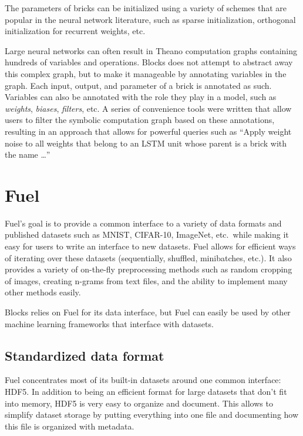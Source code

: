 \documentclass[twoside,11pt]{article}
\begin{document}
The parameters of bricks can be initialized using a variety of schemes that are
popular in the neural network literature, such as sparse initialization,
orthogonal initialization for recurrent weights, etc.

Large neural networks can often result in Theano computation graphs containing
hundreds of variables and operations. Blocks does not attempt to abstract away
this complex graph, but to make it manageable by annotating variables in the
graph. Each input, output, and parameter of a brick is annotated as such.
Variables can also be annotated with the role they play in a model, such as
\emph{weights}, \emph{biases}, \emph{filters}, etc. A series of convenience
tools were written that allow users to filter the symbolic computation graph
based on these annotations, resulting in an approach that allows for powerful
queries such as ``Apply weight noise to all weights that belong to an LSTM
unit whose parent is a brick with the name \ldots''

\section{Fuel}

Fuel's goal is to provide a common interface to a variety of data formats and
published datasets such as MNIST, CIFAR-10, ImageNet, etc.\ while making it easy
for users to write an interface to new datasets. Fuel allows for efficient ways
of iterating over these datasets (sequentially, shuffled, minibatches, etc.).
It also provides a variety of on-the-fly preprocessing methods such as random
cropping of images, creating n-grams from text files, and the ability to
implement many other methods easily.

Blocks relies on Fuel for its data interface, but Fuel can easily be used by
other machine learning frameworks that interface with datasets.

\subsection{Standardized data format}

Fuel concentrates most of its built-in datasets around one common interface:
HDF5. In addition to being an efficient format for large datasets that don't
fit into memory, HDF5 is very easy to organize and document. This allows to
simplify dataset storage by putting everything into one file and documenting
how this file is organized with metadata.
\end{document}
